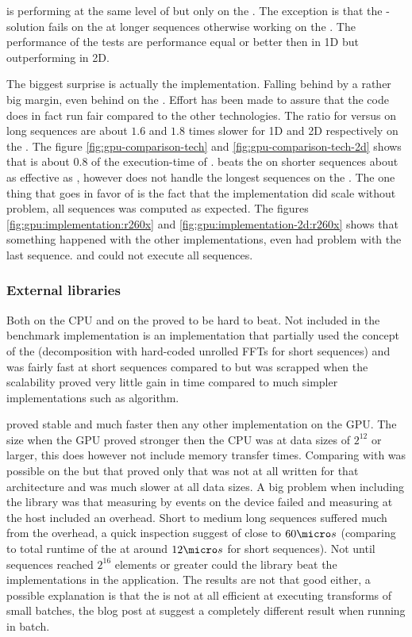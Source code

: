 {\GL} is performing at the same level of {\DX} but only on the {\AMDCARD}. The exception is that the {\GL}-solution fails on the {\AMDCARD} at longer sequences otherwise working on the {\NVCARD}. The performance of the {\GL} tests are performance equal or better then {\OCL} in 1D but outperforming {\OCL} in 2D.

The biggest surprise is actually the {\OCL} implementation. Falling behind by a rather big margin, even behind on the \AMDCARD. Effort has been made to assure that the code does in fact run fair compared to the other technologies. The ratio for {\OCL} versus {\CU} on long sequences are about $1.6$ and $1.8$ times slower for 1D and 2D respectively on the {\NVCARD}. The figure \ref{fig:gpu-comparison-tech} and \ref{fig:gpu-comparison-tech-2d} shows that {\DX} is about $0.8$ of the execution-time of {\OCL}. {\GL} beats the {\OCL} on shorter sequences about as effective as {\DX}, however does not handle the longest sequences on the {\AMDCARD}. The one thing that goes in favor of {\OCL} is the fact that the implementation did scale without problem, all sequences was computed as expected. The figures \ref{fig:gpu:implementation:r260x} and \ref{fig:gpu:implementation-2d:r260x} shows that something happened with the other implementations, even {\CLFFT} had problem with the last sequence. {\GL} and {\DX} could not execute all sequences.

\subsubsection{External libraries}

Both {\FFTW} on the CPU and {\CUFFT} on the {\NVCARD} proved to be hard to beat. Not included in the benchmark implementation is an {\CPP} implementation that partially used the concept of the {\FFTW} (decomposition with hard-coded unrolled FFTs for short sequences) and was fairly fast at short sequences compared to {\FFTW} but was scrapped when the scalability proved very little gain in time compared to much simpler implementations such as {\CGALG} algorithm.

{\CUFFT} proved stable and much faster then any other implementation on the GPU. The size when the GPU proved stronger then the CPU was at data sizes of $2^{12}$ or larger, this does however not include memory transfer times. Comparing {\CUFFT} with {\CLFFT} was possible on the {\NVCARD} but that proved only that {\CLFFT} was not at all written for that architecture and was much slower at all data sizes. A big problem when including the {\CLFFT} library was that measuring by events on the device failed and measuring at the host included an overhead. Short to medium long sequences suffered much from the overhead, a quick inspection suggest of close to $60{\micro}s$ (comparing to total runtime of the {\OCL} at around $12{\micro}s$ for short sequences). Not until sequences reached $2^16$ elements or greater could the library beat the implementations in the application. The results are not that good either, a possible explanation is that the {\CLFFT} is not at all efficient at executing transforms of small batches, the blog post at \cite{amd2015performance} suggest a completely different result when running in batch.

